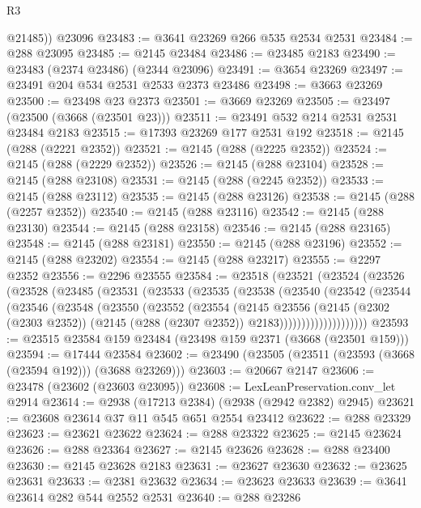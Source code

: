 \begin{lexlean}{R3}
\begin{coremodule}
        @21485))
    @23096
@23483 := @3641 @23269 @266 @535 @2534 @2531
@23484 := @288 @23095
@23485 := @2145 @23484
@23486 := @23485 @2183
@23490 := @23483 (@2374 @23486) (@2344 @23096)
@23491 := @3654 @23269
@23497 := @23491 @204 @534 @2531 @2533 @2373 @23486
@23498 := @3663 @23269
@23500 := @23498 @23 @2373
@23501 := @3669 @23269
@23505 := @23497 (@23500 (@3668 (@23501 @23)))
@23511 := @23491 @532 @214 @2531 @2531 @23484 @2183
@23515 := @17393 @23269 @177 @2531 @192
@23518 := @2145 (@288 (@2221 @2352))
@23521 := @2145 (@288 (@2225 @2352))
@23524 := @2145 (@288 (@2229 @2352))
@23526 := @2145 (@288 @23104)
@23528 := @2145 (@288 @23108)
@23531 := @2145 (@288 (@2245 @2352))
@23533 := @2145 (@288 @23112)
@23535 := @2145 (@288 @23126)
@23538 := @2145 (@288 (@2257 @2352))
@23540 := @2145 (@288 @23116)
@23542 := @2145 (@288 @23130)
@23544 := @2145 (@288 @23158)
@23546 := @2145 (@288 @23165)
@23548 := @2145 (@288 @23181)
@23550 := @2145 (@288 @23196)
@23552 := @2145 (@288 @23202)
@23554 := @2145 (@288 @23217)
@23555 := @2297 @2352
@23556 := @2296 @23555
@23584 := @23518
    (@23521
      (@23524
        (@23526
          (@23528
            (@23485
              (@23531
                (@23533
                  (@23535
                    (@23538
                      (@23540
                        (@23542
                          (@23544
                            (@23546
                              (@23548
                                (@23550
                                  (@23552
                                    (@23554
                                      (@2145
                                        @23556
                                        (@2145
                                          (@2302 (@2303 @2352))
                                          (@2145 (@288 (@2307 @2352)) @2183))))))))))))))))))))
@23593 := @23515 @23584 @159 @23484 (@23498 @159 @2371 (@3668 (@23501 @159)))
@23594 := @17444 @23584
@23602 := @23490 (@23505 (@23511 (@23593 (@3668 (@23594 @192))) (@3688 @23269)))
@23603 := @20667 @2147
@23606 := @23478 (@23602 (@23603 @23095))
@23608 := LexLeanPreservation.conv_let @2914
@23614 := @2938 (@17213 @2384) (@2938 (@2942 @2382) @2945)
@23621 := @23608 @23614 @37 @11 @545 @651 @2554 @23412
@23622 := @288 @23329
@23623 := @23621 @23622
@23624 := @288 @23322
@23625 := @2145 @23624
@23626 := @288 @23364
@23627 := @2145 @23626
@23628 := @288 @23400
@23630 := @2145 @23628 @2183
@23631 := @23627 @23630
@23632 := @23625 @23631
@23633 := @2381 @23632
@23634 := @23623 @23633
@23639 := @3641 @23614 @282 @544 @2552 @2531
@23640 := @288 @23286

\end{coremodule}
\end{lexlean}
